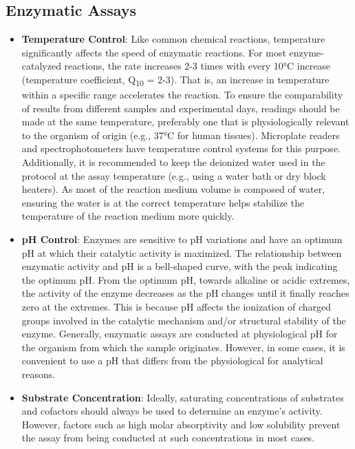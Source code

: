 \documentclass[
  9pt,
  american,
  a5paper,
  extrafontsizes,onecolumn,openright
  ]{memoir}
\begin{document}
\normalsize

\subsection{Enzymatic Assays}\label{enzymatic-assays}

\begin{itemize}
\item
  \textbf{Temperature Control}: Like common chemical reactions, temperature significantly affects the speed of enzymatic reactions. For most enzyme-catalyzed reactions, the rate increases 2-3 times with every 10°C increase (temperature coefficient, Q\textsubscript{10} = 2-3). That is, an increase in temperature within a specific range accelerates the reaction. To ensure the comparability of results from different samples and experimental days, readings should be made at the same temperature, preferably one that is physiologically relevant to the organism of origin (e.g., 37°C for human tissues). Microplate readers and spectrophotometers have temperature control systems for this purpose. Additionally, it is recommended to keep the deionized water used in the protocol at the assay temperature (e.g., using a water bath or dry block heaters). As most of the reaction medium volume is composed of water, ensuring the water is at the correct temperature helps stabilize the temperature of the reaction medium more quickly.
\item
  \textbf{pH Control}: Enzymes are sensitive to pH variations and have an optimum pH at which their catalytic activity is maximized. The relationship between enzymatic activity and pH is a bell-shaped curve, with the peak indicating the optimum pH. From the optimum pH, towards alkaline or acidic extremes, the activity of the enzyme decreases as the pH changes until it finally reaches zero at the extremes. This is because pH affects the ionization of charged groups involved in the catalytic mechanism and/or structural stability of the enzyme. Generally, enzymatic assays are conducted at physiological pH for the organism from which the sample originates. However, in some cases, it is convenient to use a pH that differs from the physiological for analytical reasons.
\item
  \textbf{Substrate Concentration}: Ideally, saturating concentrations of substrates and cofactors should always be used to determine an enzyme's activity. However, factors such as high molar absorptivity and low solubility prevent the assay from being conducted at such concentrations in most cases.

\end{itemize}
\end{document}
